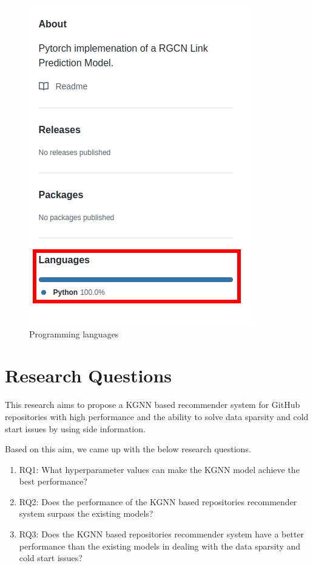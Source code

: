 \documentclass[11pt,twoside]{report}
\begin{document}
\begin{figure}[H]
    \centering
    \includegraphics[scale=0.4]{programming_languages.png}
    \caption{Programming languages}
    \label{fig:programming_languages}
\end{figure}

\section{Research Questions}
This research aims to propose a KGNN based recommender system for GitHub repositories with high performance and the ability to solve data sparsity and cold start issues by using side information.

Based on this aim, we came up with the below research questions.

\begin{enumerate}
    \item RQ1: What hyperparameter values can make the KGNN model achieve the best performance?
    \item RQ2: Does the performance of the KGNN based repositories recommender system surpass the existing models?
    \item RQ3: Does the KGNN based repositories recommender system have a better performance than the existing models in dealing with the data sparsity and cold start issues?
\end{enumerate}
\end{document}
